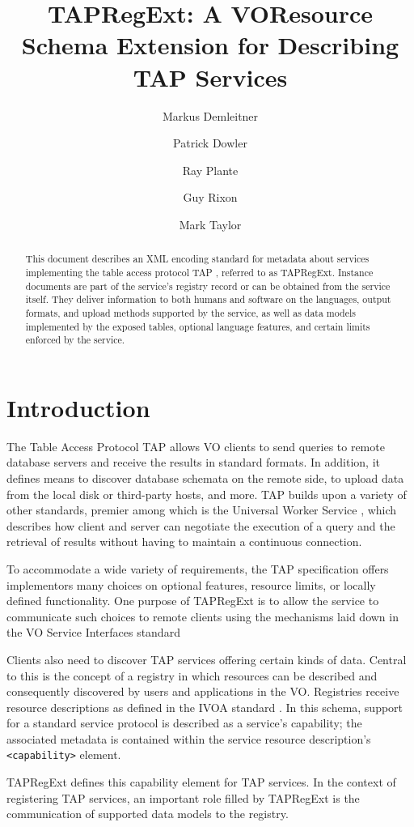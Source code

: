 \documentclass{ivoa}
\author[http://www.ivoa.net/cgi-bin/twiki/bin/view/IVOA/MarkusDemleitner]{Markus
Demleitner}
\author[http://www.ivoa.net/cgi-bin/twiki/bin/view/IVOA/PatrickDowler]{Patrick
Dowler}
\author[http://www.ivoa.net/cgi-bin/twiki/bin/view/IVOA/RayPlante]{Ray
Plante}
\author[http://www.ivoa.net/cgi-bin/twiki/bin/view/IVOA/GuyRixon]{Guy
Rixon}
\author[http://www.ivoa.net/cgi-bin/twiki/bin/view/IVOA/MarkTaylor]{Mark
Taylor}
\title{TAPRegExt: A VOResource Schema Extension for Describing TAP Services}
\begin{document}
\begin{abstract}
This document describes an XML encoding standard for metadata about
services implementing the table access protocol TAP \citep{std:TAP},
referred to as TAPRegExt.  Instance documents are
part of the service's registry record or can be obtained from the service
itself.  They deliver information to both humans and software on the languages,
output formats, and upload methods supported by the service, as well as data
models implemented by the exposed tables, optional language features,
and certain limits enforced by the service.
\end{abstract}


\section{Introduction}

\label{introduction}

The Table Access Protocol TAP \citep{std:TAP} allows
VO clients to send queries to remote database servers and receive the
results in standard formats.  In addition, it defines means to discover
database schemata on the remote side, to upload data from the local disk
or third-party hosts, and more.  TAP builds upon a variety of other
standards, premier among which is the Universal Worker Service 
\citep{std:UWS}, which describes how client and server
can negotiate the execution of a query and the retrieval of results
without having to maintain a continuous connection.

To accommodate a wide variety of requirements, the TAP specification
offers implementors many choices on optional features, resource limits, or
locally defined functionality.  One purpose of TAPRegExt is to allow the
service to communicate such choices to remote clients using the mechanisms
laid down in the VO Service Interfaces standard \citep{std:VOSI}

Clients also need to discover TAP services offering certain kinds of data.
Central to this is the concept of a registry in which resources can be
described and consequently discovered by users and applications in the VO.
Registries receive resource descriptions as defined in the IVOA standard 
\citep{std:VOR}. In this schema, support for 
a standard service protocol is described as a service's capability; the
associated metadata is contained within the service resource description's
\texttt{<capability>} element.

TAPRegExt defines this capability element for TAP services.  In the context
of registering TAP services, an important role filled by TAPRegExt is the 
communication of supported data models to the registry.
\end{document}
